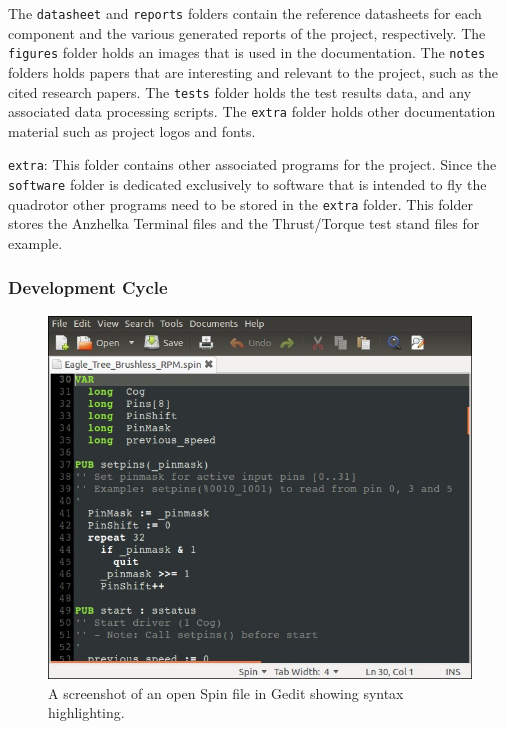 \documentclass{article}
\numberwithin{equation}{section} %
\begin{document}
The \texttt{datasheet} and \texttt{reports} folders contain the reference datasheets for each component and the various generated reports of the project, respectively. The \texttt{figures} folder holds an images that is used in the documentation. The \texttt{notes} folders holds papers that are interesting and relevant to the project, such as the cited research papers. The \texttt{tests} folder holds the test results data, and any associated data processing scripts. The \texttt{extra} folder holds other documentation material such as project logos and fonts. 

\texttt{extra}:
This folder contains other associated programs for the project. Since the \texttt{software} folder is dedicated exclusively to software that is intended to fly the quadrotor other programs need to be stored in the \texttt{extra} folder. This folder stores the Anzhelka Terminal files and the Thrust/Torque test stand files for example.



\subsubsection{Development Cycle}

\begin{figure}[h!]
  \centering
	\includegraphics[scale=.4]{gedit_spin_screenshot.jpg}
  \caption{A screenshot of an open Spin file in Gedit showing syntax highlighting.}
\end{figure}  
 
\end{document}
